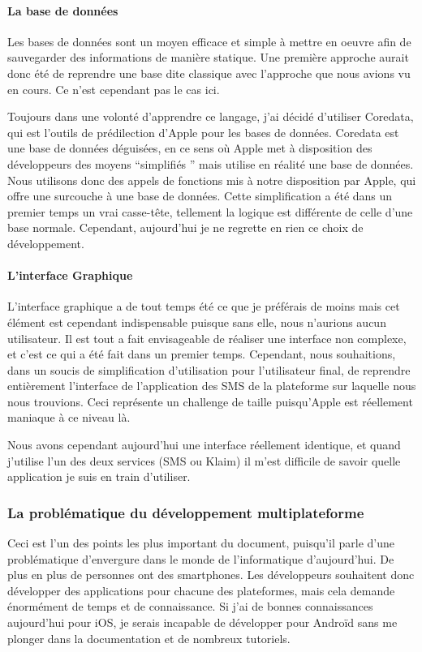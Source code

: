 \documentclass{article}
\begin{document}
		\paragraph{La base de données}
		Les bases de données sont un moyen efficace et simple à mettre en oeuvre afin de sauvegarder des informations de manière statique. Une première approche aurait donc été de reprendre une base dite classique avec l'approche que nous avions vu en cours. Ce n'est cependant pas le cas ici.
		
		Toujours dans une volonté d'apprendre ce langage, j'ai décidé d'utiliser Coredata, qui est l'outils de prédilection d'Apple pour les bases de données. Coredata est une base de données déguisées, en ce sens où Apple met à disposition des développeurs des moyens ``simplifiés '' mais utilise en réalité une base de données. Nous utilisons donc des appels de fonctions mis à notre disposition par Apple, qui offre une surcouche à une base de données. Cette simplification a été dans un premier temps un vrai casse-tête, tellement la logique est différente de celle d'une base normale. Cependant, aujourd'hui je ne regrette en rien ce choix de développement.
		
		\paragraph{L'interface Graphique}
		L'interface graphique a de tout temps été ce que je préférais de moins mais cet élément est cependant indispensable puisque sans elle, nous n'aurions aucun utilisateur. Il est tout a fait envisageable de réaliser une interface non complexe, et c'est ce qui a été fait dans un premier temps. Cependant, nous souhaitions, dans un soucis de simplification d'utilisation pour l'utilisateur final, de reprendre entièrement l'interface de l'application des SMS de la plateforme sur laquelle nous nous trouvions. Ceci représente un challenge de taille puisqu'Apple est réellement maniaque à ce niveau là. 
		
		Nous avons cependant aujourd'hui une interface réellement identique, et quand j'utilise l'un des deux services (SMS ou Klaim) il m'est difficile de savoir quelle application je suis en train d'utiliser.
		
\subsubsection{La problématique du développement multiplateforme}
		Ceci est l'un des points les plus important du document, puisqu'il parle d'une problématique d'envergure dans le monde de l'informatique d'aujourd'hui. De plus en plus de personnes ont des smartphones. Les développeurs souhaitent donc développer des applications pour chacune des plateformes, mais cela demande énormément de temps et de connaissance. Si j'ai de bonnes connaissances aujourd'hui pour iOS, je serais incapable de développer pour Androïd sans me plonger dans la documentation et de nombreux tutoriels. 
		
\end{document}
